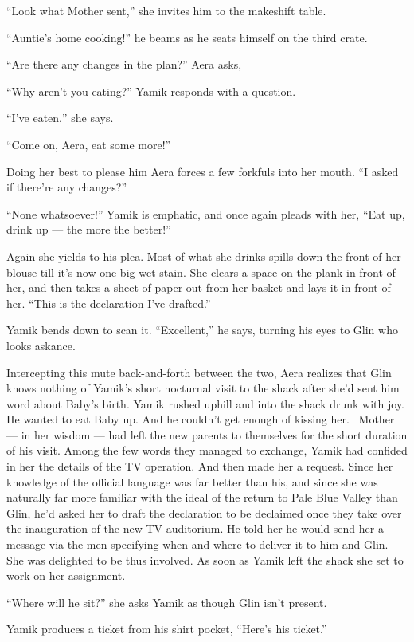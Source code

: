 \documentclass[twoside,11pt,openany]{book}
\begin{document}
``Look what Mother sent,'' she invites him to the makeshift table.

``Auntie's home cooking!'' he beams as he seats himself on the third crate.

``Are there any changes in the plan?'' Aera asks,

``Why aren't you eating?'' Yamik responds with a question.

``I've eaten,'' she says.

``Come on, Aera, eat some more!''

Doing her best to please him Aera forces a few forkfuls into her mouth. ``I asked if there're any
changes?''

``None whatsoever!'' Yamik is emphatic, and once again pleads with her, ``Eat up, drink up --- the more the better!''

Again she yields to his plea. Most of what she drinks spills down the front of her blouse till it's now one big wet
stain. She clears a space on the plank in front of her, and then takes a sheet of paper out from her basket and lays it
in front of her. ``This is the declaration I've drafted.''

Yamik bends down to scan it. ``Excellent,'' he says, turning his eyes to Glin who looks
askance.

Intercepting this mute back-and-forth between the two, Aera realizes that Glin knows nothing of Yamik's short nocturnal
visit to the shack after she'd sent him word about Baby's birth. Yamik rushed uphill and into the shack  drunk with
joy. He wanted to eat Baby up. And he{ }couldn't get enough of kissing her. ~Mother --- in her wisdom
--- had left the new parents to themselves for the short duration of his visit. Among the few words they managed to
exchange, Yamik had confided in her the details of the TV operation. And then made her a request. Since her knowledge
of the official language was far better than his, and since she was naturally far more familiar with the ideal of the
return to  Pale Blue Valley than Glin, he'd asked her to draft the declaration to be declaimed once they take over
the inauguration of the new TV auditorium. He told her he would send her a message via the men specifying when and
where to deliver it to him and Glin. She was delighted to be thus involved. As soon as Yamik left the shack she set to
work on her assignment{. }

``Where will he sit?'' she asks Yamik as though Glin isn't present.

Yamik produces a ticket from his shirt pocket, ``Here's his ticket.''
\end{document}
